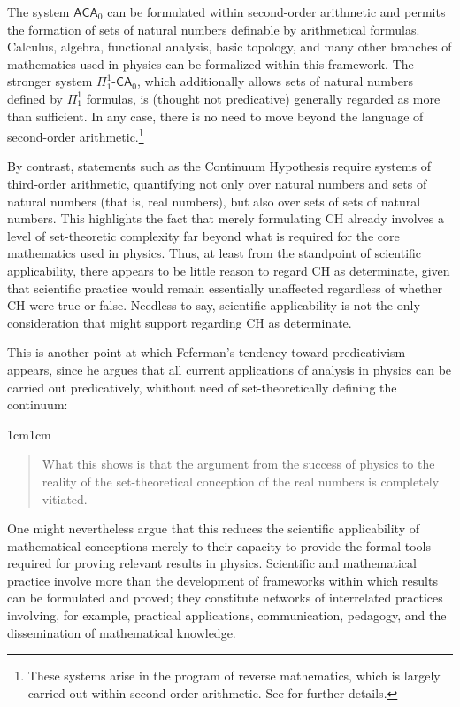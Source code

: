 \documentclass[11pt,a4paper]{book}
\theoremstyle{plain}
\begin{document}
The system $\mathsf{ACA}_0$ can be formulated within second-order arithmetic and permits the formation of sets of natural numbers definable by arithmetical formulas. Calculus, algebra, functional analysis, basic topology, and many other branches of mathematics used in physics can be formalized within this framework. The stronger system $\Pi^1_1\text{-}\mathsf{CA}_0$, which additionally allows sets of natural numbers defined by $\Pi^1_1$ formulas, is (thought not predicative) generally regarded as more than sufficient. In any case, there is no need to move beyond the language of second-order arithmetic.\footnote{These systems arise in the program of reverse mathematics, which is largely carried out within second-order arithmetic. See \textcite{Simpson2006} for further details.}

By contrast, statements such as the Continuum Hypothesis require systems of third-order arithmetic, quantifying not only over natural numbers and sets of natural numbers (that is, real numbers), but also over sets of sets of natural numbers. This highlights the fact that merely formulating CH already involves a level of set-theoretic complexity far beyond what is required for the core mathematics used in physics. Thus, at least from the standpoint of scientific applicability, there appears to be little reason to regard CH as determinate, given that scientific practice would remain essentially unaffected regardless of whether CH were true or false. Needless to say, scientific applicability is not the only consideration that might support regarding CH as determinate.

This is another point at which Feferman's tendency toward predicativism appears, since he argues \parencite[p.~22]{Feferman2011a} that all current applications of analysis in physics can be carried out predicatively, whithout need of set-theoretically defining the continuum:

\begin{adjustwidth}{1cm}{1cm}
\begin{quote}
\small
What this shows is that the argument from the success of physics to the reality of the set-theoretical conception of the real numbers is completely vitiated.
\end{quote}
\end{adjustwidth}

One might nevertheless argue that this reduces the scientific applicability of mathematical conceptions merely to their capacity to provide the formal tools required for proving relevant results in physics. Scientific and mathematical practice involve more than the development of frameworks within which results can be formulated and proved; they constitute networks of interrelated practices involving, for example, practical applications, communication, pedagogy, and the dissemination of mathematical knowledge.
\end{document}

